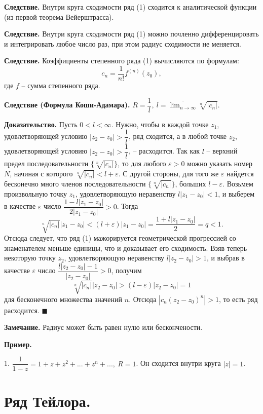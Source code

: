 \documentclass[9pt]{article}
\begin{document}
\par\textbf{Следствие.} Внутри круга сходимости ряд (1) сходится к аналитической функции (из первой теорема Вейерштрасса).
\par\textbf{Следствие.} Внутри круга сходимости ряд (1) можно почленно дифференцировать и интегрировать любое число раз, при этом радиус сходимости не меняется.
\par\textbf{Следствие.} Коэффициенты степенного ряда (1) вычисляются по формулам:
\[c_n=\dfrac{1}{n!}f^{(n)}(z_0),\]
где \(f\) -- сумма степенного ряда.
\par\textbf{Следствие (Формула Коши-Адамара).} \(R=\dfrac{1}{l},\ l=\displaystyle\overline{\lim_{n\to\infty}}\sqrt[n]{|c_n|}\).
\par\textbf{Доказательство.} Пусть \(0<l<\infty\). Нужно, чтобы в каждой точке \(z_1\), удовлетворяющей условию \(|z_2-z_0|>\dfrac{1}{l}\), ряд сходится, а в любой точке \(z_2\), удовлетворяющей условию \(|z_2-z_0|>\dfrac{1}{l}\), -- расходится. Так как \(l\) -- верхний предел последовательности \(\{\sqrt[n]{|c_n|}\}\), то для любого \(\varepsilon>0\) можно указать номер \(N\), начиная с которого \(\sqrt[n]{|c_n|}<l+\varepsilon\). С другой стороны, для того же \(\varepsilon\) найдется бесконечно много членов последовательности \(\{\sqrt[n]{|c_n|}\}\), больших \(l-\varepsilon\). Возьмем произвольную точку \(z_1\), удовлетворяющую неравенству \(l|z_1-z_0|<1\), и выберем в качестве \(\varepsilon\) число \(\dfrac{1-l|z_1-z_0|}{2|z_1-z_0|}>0\). Тогда \[\sqrt[n]{|c_n|}|z_1-z_0|<(l + \varepsilon)|z_1-z_0|=\dfrac{1+l|z_1-z_0|}{2}=q<1.\]
Отсюда следует, что ряд (1) мажорируется геометрической прогрессией со знаменателем меньше единицы, что и доказывает его сходимость. Взяв теперь некоторую точку \(z_2\), удовлетворяющую неравенству \(l|z_2-z_0|>1\), и выбрав в качестве \(\varepsilon\) число \(\dfrac{l|z_2-z_0|-1}{|z_2-z_0|}>0\), получим \[\sqrt[n]{|c_n|}|z_2-z_0|>(l-\varepsilon)|z_2-z_0|=1\] для бесконечного множества значений \(n\). Отсюда \(|c_n(z_2-z_0)^n|>1\), то есть ряд расходится. \(\blacksquare\)
\par\textbf{Замечание.} Радиус может быть равен нулю или бескончености.
\par\textbf{Пример.}
\par1. \(\dfrac{1}{1-z}=1+z+z^2+...+z^n+...,\ R=1\). Он сходится внутри круга \(|z|=1\).

\section{Ряд Тейлора.}
\end{document}
